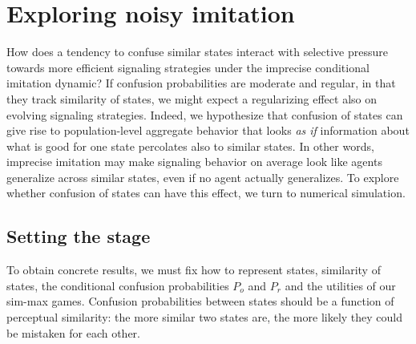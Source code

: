\documentclass[fleqn,reqno,10pt]{article}
\begin{document}


\section{Exploring noisy imitation}
\label{sec:exploring-rdd}

How does a tendency to confuse similar states interact with selective pressure towards more
efficient signaling strategies under the imprecise conditional imitation dynamic? If confusion
probabilities are moderate and regular, in that they track similarity of states, we might
expect a regularizing effect also on evolving signaling strategies. Indeed, we hypothesize that
confusion of states can give rise to population-level aggregate behavior that looks \emph{as
  if} information about what is good for one state percolates also to similar states. In other
words, imprecise imitation may make signaling behavior on average look like agents generalize
across similar states, even if no agent actually generalizes. To explore whether confusion of
states can have this effect, we turn to numerical simulation.




\subsection{Setting the stage}
\label{sec:setting-stage}

To obtain concrete results, we must fix how to represent states, similarity of states, the
conditional confusion probabilities $P_o$ and $P_r$ and the utilities of our sim-max
games. Confusion probabilities between states should be a function of perceptual similarity:
the more similar two states are, the more likely they could be mistaken for each other. 
\end{document}
